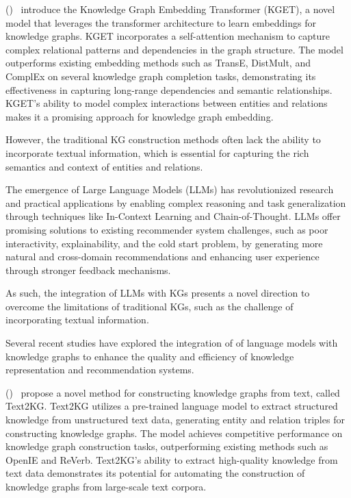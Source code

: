\documentclass[11pt,a4paper,openany,oneside,titlepage]{article}
\newcommand{\citewithnumber}[1]{%
  \citeauthor{#1} (\citeyear{#1})~\cite{#1}%
}
\begin{document}
\citewithnumber {zhang2021kget} introduce the Knowledge Graph Embedding Transformer (KGET), a novel model that leverages the transformer architecture to learn embeddings for knowledge graphs. KGET incorporates a self-attention mechanism to capture complex relational patterns and dependencies in the graph structure. The model outperforms existing embedding methods such as TransE, DistMult, and ComplEx on several knowledge graph completion tasks, demonstrating its effectiveness in capturing long-range dependencies and semantic relationships. KGET's ability to model complex interactions between entities and relations makes it a promising approach for knowledge graph embedding.

However, the traditional KG construction methods often lack the ability to incorporate textual information, which is essential for capturing the rich semantics and context of entities and relations. 

The emergence of Large Language Models (LLMs) has revolutionized research and practical applications by enabling complex reasoning and task generalization through techniques like In-Context Learning and Chain-of-Thought. LLMs offer promising solutions to existing recommender system challenges, such as poor interactivity, explainability, and the cold start problem, by generating more natural and cross-domain recommendations and enhancing user experience through stronger feedback mechanisms.

As such, the integration of LLMs with KGs presents a novel direction to overcome the limitations of traditional KGs, such as the challenge of incorporating textual information. 

Several recent studies have explored the integration of of language models with knowledge graphs to enhance the quality and efficiency of knowledge representation and recommendation systems.

\citewithnumber {xu2021text2kg} propose a novel method for constructing knowledge graphs from text, called Text2KG. Text2KG utilizes a pre-trained language model to extract structured knowledge from unstructured text data, generating entity and relation triples for constructing knowledge graphs. The model achieves competitive performance on knowledge graph construction tasks, outperforming existing methods such as OpenIE and ReVerb. Text2KG's ability to extract high-quality knowledge from text data demonstrates its potential for automating the construction of knowledge graphs from large-scale text corpora.
\end{document}
